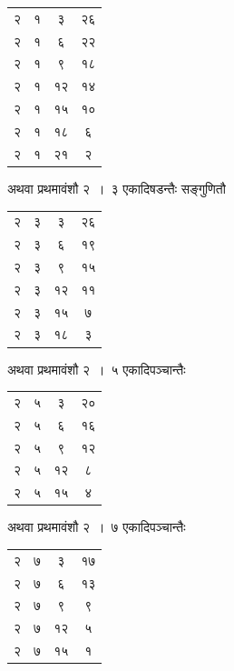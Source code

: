 \documentclass[11pt, openany]{book}
\begin{document}
\begin{table}[h]
	\centering
	\setlength{\extrarowheight}{3pt} \setlength{\tabcolsep}{6pt}
	\begin{tabular}{|c|c|c|c|}
		\hline
	२ & १ & ३ & २६\\
	     २ & १ & ६ & २२\\
	     २ & १ & ९ & १८\\
	     २ & १ & १२ & १४ \\
	     २ & १ & १५ & १०\\
	     २ & १ & १८ & ६\\
	     २ & १ & २१ & २\\
	     \hline
\end{tabular}
\end{table}
अथवा प्रथमावंशौ २~।~३ एकादिषडन्तैः सङ्गुणितौ\textendash
\begin{table}[h]
	\centering
	\setlength{\extrarowheight}{3pt} \setlength{\tabcolsep}{6pt}
	\begin{tabular}{|c|c|c|c|}
		\hline
		२ & ३ & ३ & २६\\
		२ & ३ & ६ & १९\\
		२ & ३ & ९ & १५\\
		२ & ३ & १२ & ११ \\
		२ & ३ & १५ & ७\\
		२ & ३ & १८ & ३\\
		\hline
	\end{tabular}
\end{table}

अथवा प्रथमावंशौ २~।~५ एकादिपञ्चान्तैः\textendash
\begin{table}[h]
	\centering
	\setlength{\extrarowheight}{1pt} \setlength{\tabcolsep}{6pt}
	\begin{tabular}{|c|c|c|c|}
		\hline
		२ & ५ & ३ & २०\\
		२ & ५ & ६ & १६\\
		२ & ५ & ९ & १२\\
		२ & ५ & १२ & ८ \\
		२ & ५ & १५ & ४\\
	\hline
	\end{tabular}
\end{table}

\newpage

\begin{minipage}[]{0.6\textwidth}
अथवा प्रथमावंशौ २~।~७ एकादिपञ्चान्तैः\textemdash 
\end{minipage}
\begin{minipage}[]{0.5\textwidth}
	\begin{tabular}{|c|c|c|c|}
		\hline
		२ & ७ & ३ & १७\\
		२ & ७ & ६ & १३\\
		२ & ७ & ९ & ९\\
		२ & ७ & १२ & ५ \\
		२ & ७ & १५ & १\\
		\hline
	\end{tabular}
\end{minipage}
\vspace{2mm}
\end{document}
